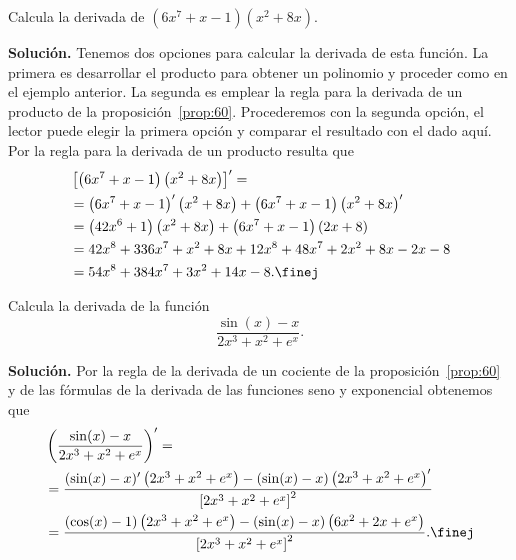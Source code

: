 \documentclass[12pt,a4paper]{book}
\begin{document}
    \begin{ejemplo}\label{ejm:78}
        Calcula la derivada de $\left(6x^{7}+x-1\right)\left(x^{2}+8x\right)$.

        \textbf{Solución.} Tenemos dos opciones para calcular la derivada de esta función.
        La primera es desarrollar el producto para obtener un polinomio y proceder
        como en el ejemplo anterior. La segunda es emplear la regla para la derivada
        de un producto de la proposición~\ref{prop:60}. Procederemos con la segunda opción,
        el lector puede elegir la primera opción y comparar el resultado con el dado
        aquí. Por la regla para la derivada de un producto resulta que
        \begin{align*}
            &\left[\left(6x^{7}+x-1\right)\left(x^{2}+8x\right)\right]'=\\
            &=\left(6x^{7}+x-1\right)'\left(x^{2}+8x\right)+\left(6x^{7}+x-1\right)\left(x^{2}+8x\right)'\\
            &=\left(42x^{6}+1\right)\left(x^{2}+8x\right)+\left(6x^{7}+x-1\right)(2x+8)\\
            &=42x^{8}+336x^{7}+x^{2}+8x+12x^{8}+48x^{7}+2x^{2}+8x-2x-8\\
            &=54x^{8}+384x^{7}+3x^{2}+14x-8.\finej
        \end{align*}
    \end{ejemplo}

    \begin{ejemplo}\label{ejm:79}
        Calcula la derivada de la función
        \begin{equation*}
            \frac{\sin(x)-x}{2x^{3}+x^{2}+e^{x}}.
        \end{equation*}

        \textbf{Solución.} Por la regla de la derivada de un cociente de la proposición~\ref{prop:60} y
        de las fórmulas de la derivada de las funciones seno y exponencial obtenemos
        que
        \begin{align*}
            &\left(\frac{\sin(x)-x}{2x^{3}+x^{2}+e^{x}}\right)'=\\
            &=\frac{(\sin(x)-x)'\left(2x^{3}+x^{2}+e^{x}\right)-(\sin(x)-x)\left(2x^{3}+x^{2}+e^{x}\right)'}{\left[2x^{3}+x^{2}+e^{x}\right]^{2}}\\
            &=\frac{(\cos(x)-1)\left(2x^{3}+x^{2}+e^{x}\right)-(\sin(x)-x)\left(6x^{2}+2x+e^{x}\right)}{\left[2x^{3}+x^{2}+e^{x}\right]^{2}}.\finej
        \end{align*}
    \end{ejemplo}
\end{document}
